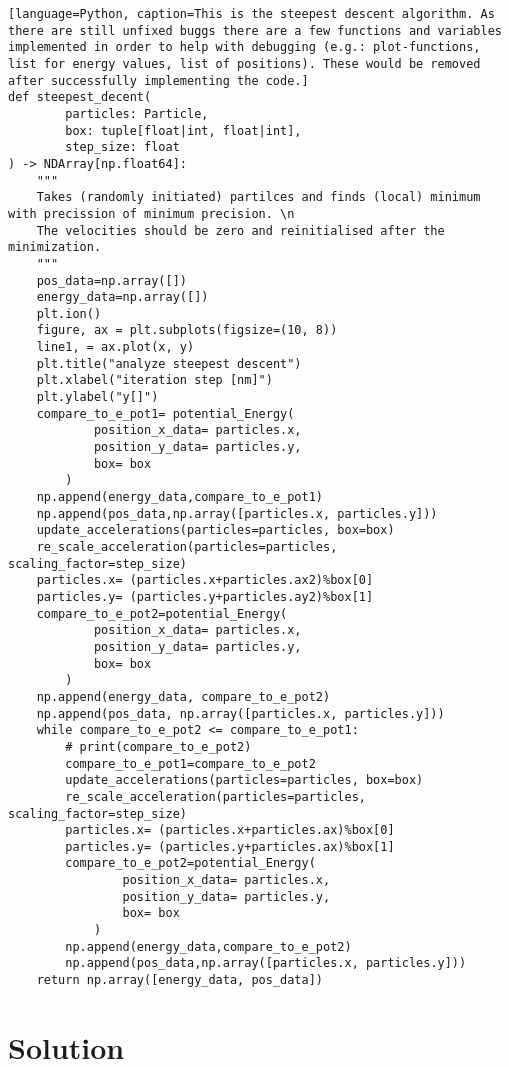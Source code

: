 \documentclass{article}
\begin{document}
\begin{lstlisting}[language=Python, caption=This is the steepest descent algorithm. As there are still unfixed buggs there are a few functions and variables implemented in order to help with debugging (e.g.: plot-functions, list for energy values, list of positions). These would be removed after successfully implementing the code.]
def steepest_decent(
        particles: Particle,
        box: tuple[float|int, float|int],
        step_size: float
) -> NDArray[np.float64]:
    """
    Takes (randomly initiated) partilces and finds (local) minimum with precission of minimum precision. \n
    The velocities should be zero and reinitialised after the minimization.
    """
    pos_data=np.array([])
    energy_data=np.array([])
    plt.ion()
    figure, ax = plt.subplots(figsize=(10, 8))
    line1, = ax.plot(x, y)
    plt.title("analyze steepest descent")
    plt.xlabel("iteration step [nm]")
    plt.ylabel("y[]")
    compare_to_e_pot1= potential_Energy(
            position_x_data= particles.x,
            position_y_data= particles.y,
            box= box
        )
    np.append(energy_data,compare_to_e_pot1)
    np.append(pos_data,np.array([particles.x, particles.y]))
    update_accelerations(particles=particles, box=box)
    re_scale_acceleration(particles=particles, scaling_factor=step_size)
    particles.x= (particles.x+particles.ax2)%box[0]
    particles.y= (particles.y+particles.ay2)%box[1]
    compare_to_e_pot2=potential_Energy(
            position_x_data= particles.x,
            position_y_data= particles.y,
            box= box
        )
    np.append(energy_data, compare_to_e_pot2)
    np.append(pos_data, np.array([particles.x, particles.y]))
    while compare_to_e_pot2 <= compare_to_e_pot1:
        # print(compare_to_e_pot2)
        compare_to_e_pot1=compare_to_e_pot2
        update_accelerations(particles=particles, box=box)
        re_scale_acceleration(particles=particles, scaling_factor=step_size)
        particles.x= (particles.x+particles.ax)%box[0]
        particles.y= (particles.y+particles.ax)%box[1]
        compare_to_e_pot2=potential_Energy(
                position_x_data= particles.x,
                position_y_data= particles.y,
                box= box
            )
        np.append(energy_data,compare_to_e_pot2)
        np.append(pos_data,np.array([particles.x, particles.y]))
    return np.array([energy_data, pos_data])
\end{lstlisting}

\section{Solution}
\end{document}
